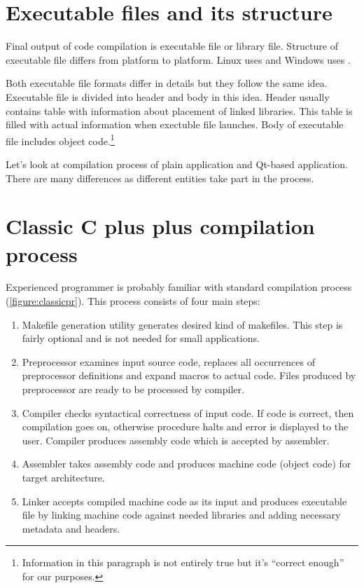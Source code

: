 \section{Executable files and its structure}
Final output of \cpp code compilation is executable file or library file. Structure of executable file differs from platform to platform. Linux uses  and Windows uses .

Both executable file formats differ in details but they follow the same idea. Executable file is divided into header and body in this idea. Header usually contains table with information about placement of linked libraries. This table is filled with actual information when exectuble file launches. Body of executable file includes object code.\footnote{Information in this paragraph is not entirely true but it's \enquote{correct enough} for our purposes.}

Let's look at compilation process of plain \cpp application and Qt-based application. There are many differences as different entities take part in the process.

\section{Classic C plus plus compilation process}
Experienced \cpp programmer is probably familiar with standard compilation process (\autoref{figure:classicpr}). This process consists of four main steps:
\begin{enumerate}
\item Makefile generation utility generates desired kind of makefiles. This step is fairly optional and is not needed for small applications.
\item Preprocessor examines input source code, replaces all occurrences of preprocessor definitions and expand macros to actual code. Files produced by preprocessor are ready to be processed by compiler.
\item Compiler checks syntactical correctness of input \cpp code. If code is correct, then compilation goes on, otherwise procedure halts and error is displayed to the user. Compiler produces assembly code which is accepted by assembler.
\item Assembler takes assembly code and produces machine code (object code) for target architecture.
\item Linker accepts compiled machine code as its input and produces executable file by linking machine code against needed libraries and adding necessary metadata and headers.
\end{enumerate}

